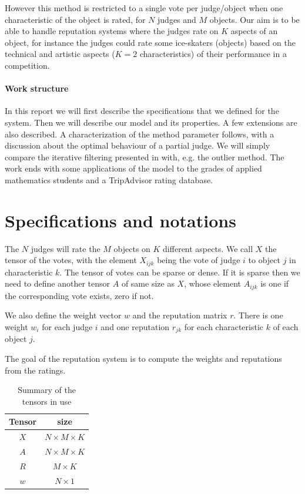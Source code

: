 \documentclass[12pt,a4paper]{article}
\begin{document}
However this method is restricted to a single vote per judge/object when one characteristic of the object is rated, for $N$ judges and $M$ objects. Our aim is to be able to handle reputation systems where the judges rate on $K$ aspects of an object, for instance the judges could rate some ice-skaters (objects) based on the technical and artistic aspects ($K=2$ characteristics) of their performance in a competition. 

\paragraph{Work structure}
In this report we will first describe the specifications that we defined for the system. Then we will describe our model and its properties. A few extensions are also described. A characterization of the method parameter follows, with a discussion about the optimal behaviour of a partial judge. We will simply compare the iterative filtering presented in \cite{Cristo1} with, e.g. the outlier method. The work ends with some applications of the model to the grades of applied mathematics students and a TripAdvisor rating database.\\


\section{Specifications and notations}
The $N$ judges will rate the $M$ objects on $K$ different aspects. We call $X$ the tensor of the votes, with the element $X_{ijk}$ being the vote of judge $i$ to object $j$ in characteristic $k$. The tensor of votes can be sparse or dense. If it is sparse then we need to define another tensor $A$ of same size as $X$, whose element $A_{ijk}$ is one if the corresponding vote exists, zero if not.

We also define the weight vector $w$ and the reputation matrix $r$. There is one weight $w_i$ for each judge $i$ and one reputation $r_{jk}$ for each characteristic $k$ of each object $j$.

The goal of the reputation system is to compute the weights and reputations from the ratings.

\begin{table}
\centering
\begin{tabular}{|c|c|}
\hline 
Tensor & size\\
\hline
$X$ & $N\times M \times K$\\
\hline
$A$ & $N\times M \times K$\\
\hline
$R$ & $M\times K$\\
\hline
$w$ & $N\times 1$\\
\hline
\end{tabular}
\caption{Summary of the tensors in use}
\end{table}
\end{document}
